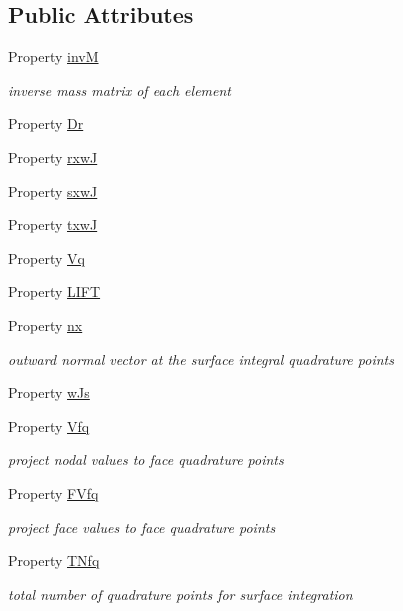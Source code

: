 \subsection*{Public Attributes}
\begin{DoxyCompactItemize}
\item 
Property \hyperlink{class_ndg_gauss_quad_strong_form_solver_a39869256b096d0f82c7a35fda8164d6f}{invM}
\begin{DoxyCompactList}\small\item\em inverse mass matrix of each element \end{DoxyCompactList}\item 
Property \hyperlink{class_ndg_gauss_quad_strong_form_solver_a3bd89a3fb6a175d2e078dcdc55af77c6}{Dr}
\item 
Property \hyperlink{class_ndg_gauss_quad_strong_form_solver_af27ddd9eb5b5ef7527ecc53cfa2b43a8}{rxwJ}
\item 
Property \hyperlink{class_ndg_gauss_quad_strong_form_solver_ae33a3c3db8fda1415e06c708a0724dcc}{sxwJ}
\item 
Property \hyperlink{class_ndg_gauss_quad_strong_form_solver_ad6c758963ce377b88b0525a479e07ec0}{txwJ}
\item 
Property \hyperlink{class_ndg_gauss_quad_strong_form_solver_a253efb18a8ea4ca601f7939ae6fde2d6}{Vq}
\item 
Property \hyperlink{class_ndg_gauss_quad_strong_form_solver_a4df3885d99150b33ef03beb7fc299f7a}{L\+I\+FT}
\item 
Property \hyperlink{class_ndg_gauss_quad_strong_form_solver_aa15d6e4ecc5de15ec845356e619f68a3}{nx}
\begin{DoxyCompactList}\small\item\em outward normal vector at the surface integral quadrature points \end{DoxyCompactList}\item 
Property \hyperlink{class_ndg_gauss_quad_strong_form_solver_a9bd343fd405d78c7419540d31a9cf131}{w\+Js}
\item 
Property \hyperlink{class_ndg_gauss_quad_strong_form_solver_a4ce60f505d4197514449c0ceef7ce90c}{Vfq}
\begin{DoxyCompactList}\small\item\em project nodal values to face quadrature points \end{DoxyCompactList}\item 
Property \hyperlink{class_ndg_gauss_quad_strong_form_solver_ac3b114f729b885a6502b806a4470544c}{F\+Vfq}
\begin{DoxyCompactList}\small\item\em project face values to face quadrature points \end{DoxyCompactList}\item 
Property \hyperlink{class_ndg_gauss_quad_strong_form_solver_addd134051c5bdd3a93939e5cb7bacaf3}{T\+Nfq}
\begin{DoxyCompactList}\small\item\em total number of quadrature points for surface integration \end{DoxyCompactList}\end{DoxyCompactItemize}


